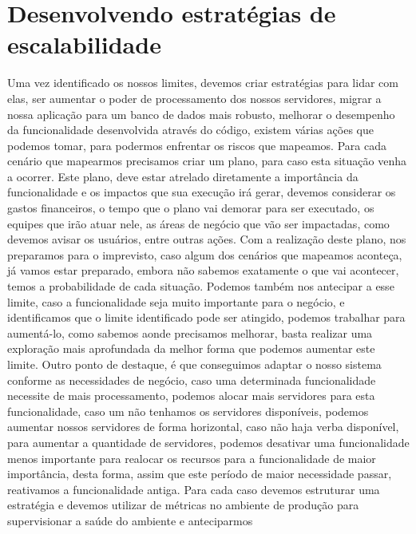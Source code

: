     \section{Desenvolvendo estratégias de escalabilidade}
      Uma vez identificado os nossos limites, devemos criar estratégias para lidar
      com elas, ser aumentar o poder de processamento dos nossos servidores,
      migrar a nossa aplicação para um banco de dados mais robusto, melhorar o
      desempenho da funcionalidade desenvolvida através do código, existem
      várias ações que podemos tomar, para podermos enfrentar os riscos que
      mapeamos. \newline
      Para cada cenário que mapearmos precisamos criar um plano, para caso esta
      situação venha a ocorrer. Este plano, deve estar atrelado diretamente a
      importância da funcionalidade e os impactos que sua execução irá gerar,
      devemos considerar os gastos financeiros, o tempo que o plano vai demorar
      para ser executado, os equipes que irão atuar nele, as áreas de negócio que vão
      ser impactadas, como devemos avisar os usuários, entre outras ações. Com a
      realização deste plano, nos preparamos para o imprevisto, caso algum dos
      cenários que mapeamos aconteça, já vamos estar preparado, embora não sabemos
      exatamente o que vai acontecer, temos a probabilidade de cada situação. Podemos
      também nos antecipar a esse limite, caso a funcionalidade seja muito importante
      para o negócio, e identificamos que o limite identificado pode ser atingido,
      podemos trabalhar para aumentá-lo, como sabemos aonde precisamos melhorar,
      basta realizar uma exploração mais aprofundada da melhor forma que podemos
      aumentar este limite. Outro ponto de destaque, é que conseguimos adaptar o
      nosso sistema conforme as necessidades de negócio, caso uma determinada
      funcionalidade necessite de mais processamento, podemos alocar mais servidores
      para esta funcionalidade, caso um não tenhamos os servidores disponíveis,
      podemos aumentar nossos servidores de forma horizontal, caso não haja verba
      disponível, para aumentar a quantidade de servidores, podemos desativar uma
      funcionalidade menos importante para realocar os recursos para a funcionalidade
      de maior importância, desta forma, assim que este período de maior necessidade
      passar, reativamos a funcionalidade antiga. \newline
      Para cada caso devemos estruturar uma estratégia e devemos utilizar de métricas
      no ambiente de produção para supervisionar a saúde do ambiente e anteciparmos
